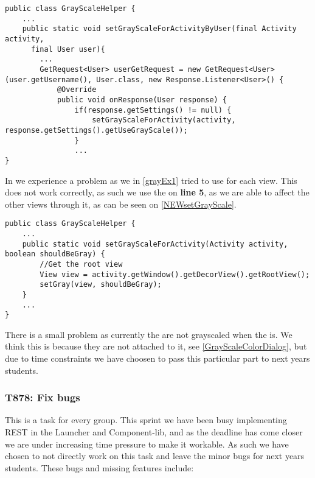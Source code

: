 \begin{minipage}[H]{\linewidth}
\begin{lstlisting}[caption = Finds the grayscale setting for each user, label =
NEWsetGrayScaleUser] 
public class GrayScaleHelper {
	...
	public static void setGrayScaleForActivityByUser(final Activity activity, 
	  final User user){
		...
		GetRequest<User> userGetRequest = new GetRequest<User>(user.getUsername(), User.class, new Response.Listener<User>() {
            @Override
            public void onResponse(User response) {
           		if(response.getSettings() != null) {
               		setGrayScaleForActivity(activity, response.getSettings().getUseGrayScale());
               	}
	 			...
}
\end{lstlisting}
\end{minipage}

In  we experience a problem as we in
\autoref{grayEx1} tried to use  for each view. This does not work
correctly, as such we use the  on \textbf{line
5}, as we are able to affect the other views through it, as can be seen on
\autoref{NEWsetGrayScale}.

\begin{minipage}[H]{\linewidth}
\begin{lstlisting}[caption = The root View is used instead of all the seperate
views, label = NEWsetGrayScale] public class GrayScaleHelper {
	...
    public static void setGrayScaleForActivity(Activity activity, boolean shouldBeGray) {
        //Get the root view
        View view = activity.getWindow().getDecorView().getRootView();
        setGray(view, shouldBeGray);
    }
    ...
}
\end{lstlisting}
\end{minipage}

There is a small problem as currently the  are not grayscaled
when the  is. We think this is because they are not attached to
it, see \autoref{GrayScaleColorDialog}, but due to time constraints we have
choosen to pass this particular part to next years students. 


\subsubsection{T878: Fix bugs}
This is a task for every group. This sprint we have been busy implementing REST
in the Launcher and Component-lib, and as the deadline has come closer we are
under increasing time pressure to make it workable. As such we have chosen to
not directly work on this task and leave the minor bugs for next years students.
These bugs and missing features include:

